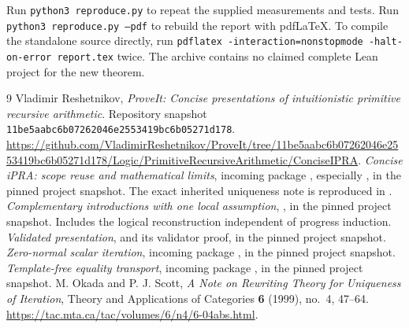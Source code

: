 Run \texttt{python3 reproduce.py} to repeat the supplied measurements and
tests.  Run \texttt{python3 reproduce.py --pdf} to rebuild the report with
pdfLaTeX.  To compile the standalone source directly, run
\texttt{pdflatex -interaction=nonstopmode -halt-on-error report.tex} twice.
The archive contains no claimed complete Lean project for the new theorem.

\begin{thebibliography}{9}
\footnotesize\setlength{\itemsep}{3pt}
 Vladimir Reshetnikov, \emph{ProveIt: Concise presentations
of intuitionistic primitive recursive arithmetic}.  Repository snapshot
\texttt{11be5aabc6b07262046e2553419bc6b05271d178}.
\url{https://github.com/VladimirReshetnikov/ProveIt/tree/11be5aabc6b07262046e2553419bc6b05271d178/Logic/PrimitiveRecursiveArithmetic/ConciseIPRA}.
 \emph{Concise iPRA: scope reuse and mathematical limits},
incoming package , especially
, in the pinned project snapshot.
The exact inherited uniqueness note is reproduced in .
 \emph{Complementary introductions with one local assumption},
,
in the pinned project snapshot.  Includes the logical reconstruction
independent of progress induction.
 \emph{Validated presentation},
and its validator proof, in the pinned project snapshot.
 \emph{Zero-normal scalar iteration}, incoming package
, in the pinned project snapshot.
 \emph{Template-free equality transport}, incoming
package , in the pinned project snapshot.
 M. Okada and P. J. Scott,
\emph{A Note on Rewriting Theory for Uniqueness of Iteration},
Theory and Applications of Categories \textbf{6} (1999), no.~4, 47--64.
\url{https://tac.mta.ca/tac/volumes/6/n4/6-04abs.html}.
\end{thebibliography}

